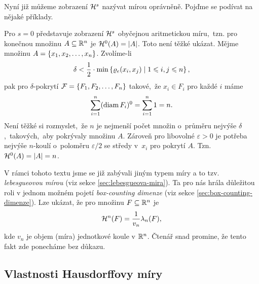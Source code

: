 Nyní již můžeme zobrazení $\mathcal{H}^{s}$ nazývat mírou oprávněně. Pojďme se podívat na nějaké příklady.
\begin{example}
    Pro $s=0$ představuje zobrazení $\mathcal{H}^{s}$ obyčejnou aritmetickou míru,~tzn. pro konečnou množinu $A\subseteq\mathbb{R}^n$ je $\mathcal{H}^{0}(A)=|A|$. Toto není těžké ukázat. Mějme množinu $A=\left\{x_1,x_2,\ldots,x_n\right\}$. Zvolíme-li
    \[\delta<\dfrac{1}{2}\cdot\min\left\{\varrho_e(x_i,x_j)\mid 1\leqslant i,j\leqslant n\right\},\]
    pak pro $\delta$-pokrytí $\mathcal{F}=\left\{F_1,F_2,\ldots,F_n\right\}$ takové,~že $x_i\in F_i$ pro každé $i$ máme
    \[\sum_{i=1}^{n}(\operatorname{diam}{F_i})^0=\sum_{i=1}^{n}1=n.\]
    Není těžké si rozmyslet,~že $n$ je nejmenší počet množin o~průměru nejvýše $\delta$,~takových,~aby pokrývaly množinu $A$. Zároveň pro libovolné $\varepsilon>0$ je potřeba nejvýše $n$-koulí o~poloměru $\varepsilon/2$ se středy v~$x_i$ pro pokrytí $A$. Tzn.~$\mathcal{H}^{0}(A)=|A|=n$.
\end{example}

V rámci tohoto textu jsme se již zabývali jiným typem míry a to tzv. \emph{lebesgueovou mírou} (viz sekce \ref{sec:lebesgueova-mira}). Ta pro nás hrála důležitou roli v jednom možném pojetí \emph{box-counting dimenze} (viz sekce \ref{sec:box-counting-dimenze}). Lze ukázat, že pro množinu $F\subseteq\mathbb{R}^n$ je
\[\mathcal{H}^{n}(F)=\dfrac{1}{v_n}\lambda_n(F),\]
kde $v_n$ je objem (míra) jednotkové koule v $\mathbb{R}^n$. Čtenář snad promine, že tento fakt zde ponecháme bez důkazu. \citep[str. 45]{Falconer2014}

\subsection{Vlastnosti Hausdorffovy míry}\label{subsec:vlastnosti-hausdorffovy-miry}

